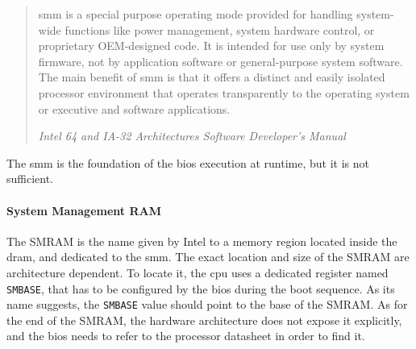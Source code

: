 
\begin{quote}
  \ac{smm} is a special purpose operating mode provided for handling system-wide
  functions like power management, system hardware control, or proprietary
  OEM-designed code.
  It is intended for use only by system firmware, not by application software or
  general-purpose system software.
  The main benefit of \ac{smm} is that it offers a distinct and easily isolated
  processor environment that operates transparently to the operating system or
  executive and software applications.

  \hfill \small \emph{Intel 64 and IA-32 Architectures Software Developer’s
    Manual}
\end{quote}

The \ac{smm} is the foundation of the \ac{bios} execution at runtime, but it is
not sufficient.

\paragraph{System Management RAM}
%
The SMRAM is the name given by Intel to a memory region located inside the
\ac{dram}, and dedicated to the \ac{smm}.
%
The exact location and size of the SMRAM are architecture dependent.
%
To locate it, the \ac{cpu} uses a dedicated register named \texttt{SMBASE}, that
has to be configured by the \ac{bios} during the boot sequence.
%
As its name suggests, the \texttt{SMBASE} value should point to the base of the
SMRAM.
%
As for the end of the SMRAM, the hardware architecture does not expose it
explicitly, and the \ac{bios} needs to refer to the processor datasheet in order
to find it.

